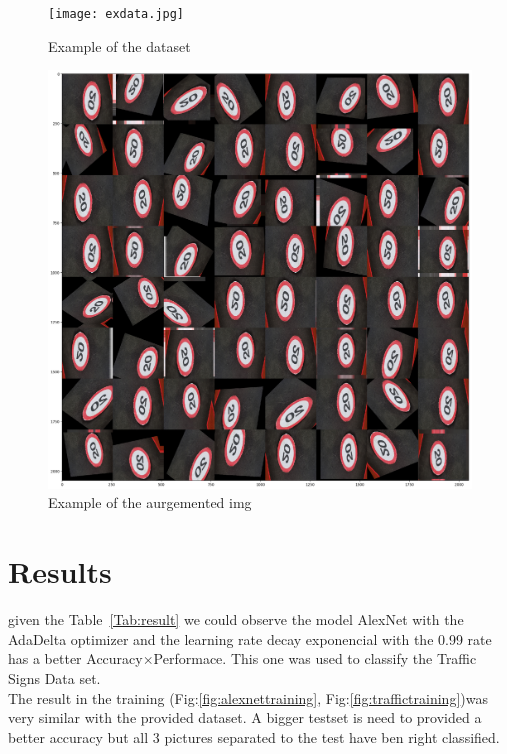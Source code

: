 \documentclass[10pt,journal,compsoc]{IEEEtran}
\begin{document}
\begin{figure}[thpb]
      \centering
      \texttt{[image: exdata.jpg]}
      \caption{Example of the dataset}
      \label{fig:dataset1}
\end{figure}

\begin{figure}[thpb]
      \centering
      \includegraphics[width=\linewidth]{exdataaug}
      \caption{Example of the aurgemented img}
      \label{fig:augimg}

\end{figure}

\section{Results}

given the Table~\ref{Tab:result} we could observe the model AlexNet with the AdaDelta optimizer and the learning rate decay exponencial with the 0.99 rate
has a better Accuracy$\times$Performace. This one was used to classify the Traffic Signs Data set.\\
The result in the training (Fig:\ref{fig:alexnettraining}, Fig:\ref{fig:traffictraining})was very similar with the provided dataset. A bigger testset is need to provided a better
accuracy but all 3 pictures separated to the test have ben right classified.
\end{document}
